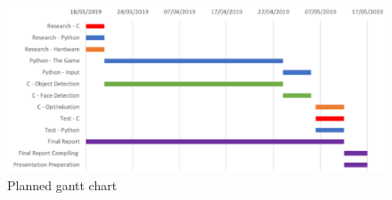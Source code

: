 \begin{figure}[h]
\centering
\includegraphics[scale=0.6]{gantt}
\caption{Planned gantt chart}
\label{gantt}
\end{figure}




